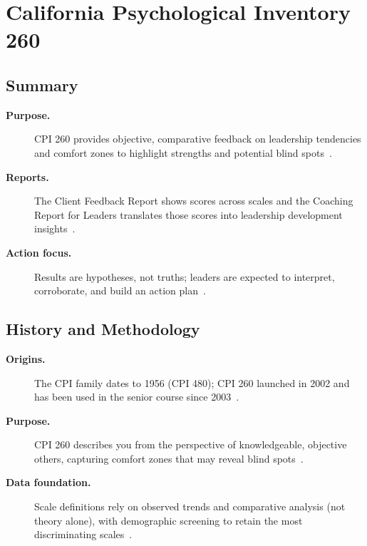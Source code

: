 \documentclass[../main.tex]{subfiles}
\begin{document}
\section{California Psychological Inventory 260}

\subsection{Summary}
\begin{description}
  \item[\textbf{Purpose.}] CPI 260 provides objective, comparative feedback on leadership tendencies and comfort zones to highlight strengths and potential blind spots~\autocite{edo-5-1-9-cpi-260-2025}.
  \item[\textbf{Reports.}] The Client Feedback Report shows scores across scales and the Coaching Report for Leaders translates those scores into leadership development insights~\autocite{edo-5-1-9-cpi-260-2025}.
  \item[\textbf{Action focus.}] Results are hypotheses, not truths; leaders are expected to interpret, corroborate, and build an action plan~\autocite{edo-5-1-9-cpi-260-2025}.
\end{description}

\subsection{History and Methodology}
\begin{description}
  \item[\textbf{Origins.}] The CPI family dates to 1956 (CPI 480); CPI 260 launched in 2002 and has been used in the senior course since 2003~\autocite{edo-5-1-9-cpi-260-2025}.
  \item[\textbf{Purpose.}] CPI 260 describes you from the perspective of knowledgeable, objective others, capturing comfort zones that may reveal blind spots~\autocite{edo-5-1-9-cpi-260-2025}.
  \item[\textbf{Data foundation.}] Scale definitions rely on observed trends and comparative analysis (not theory alone), with demographic screening to retain the most discriminating scales~\autocite{edo-5-1-9-cpi-260-2025}.
\end{description}
\end{document}
